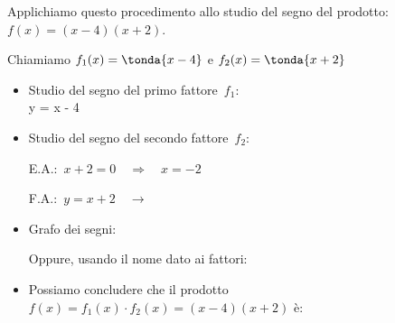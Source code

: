 \begin{esempio}
Applichiamo questo procedimento allo studio del segno del 
prodotto: \\
\(f(x)=(x-4)(x+2)\).

Chiamiamo \(f_1(x)=\tonda{x-4}\) \quad e \quad \(f_2(x)=\tonda{x+2}\)

\begin{itemize} [noitemsep]
 \item Studio del segno del primo fattore~\(f_1\):\\
 
           {y = x - 4 \quad \rightarrow}
           {}
 \item Studio del segno del secondo fattore~\(f_2\):\\
 \begin{minipage}{.45\textwidth}
  E.A.:~\(x + 2 = 0 \quad \Rightarrow \quad x=-2\)
 \end{minipage}
 \begin{minipage}{.25\textwidth}
  F.A.:~\(y = x + 2 \quad \rightarrow\)
 \end{minipage}
 \begin{minipage}{.3\textwidth}
%   
 \end{minipage}
 \item Grafo dei segni:
 
 \segnoprodottoa
 
 Oppure, usando il nome dato ai fattori: 
 
 \segnoprodottoas
 \item Possiamo concludere che il prodotto 
 \(f(x) = f_1(x) \cdot f_2(x)=(x -4)(x +2)\) è:
\end{itemize}
\end{esempio}
